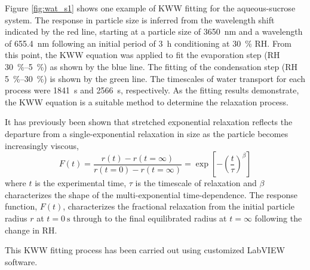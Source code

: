 Figure \ref{fig:wat_s1} shows one example of KWW fitting for the aqueous-sucrose system. The response in particle size is inferred from the wavelength shift indicated by the red line, starting at a particle size of \SI{3650}{\nano\meter} and a wavelength of \SI{655.4}{\nano\meter} following an initial period of \SI{3}{\hour} conditioning at \SI{30}{\percent} RH. From this point, the KWW equation was applied to fit the evaporation step (RH \SIrange{30}{5}{\percent}) as shown by the blue line. The fitting of the condensation step (RH \SIrange{5}{30}{\percent}) is shown by the green line. The timescales of water transport for each process were \SI{1841}{\second} and \SI{2566}{\second}, respectively. As the fitting results demonstrate, the KWW equation is a suitable method to determine the relaxation process. 

It has previously been shown that stretched exponential relaxation reflects the departure from a single-exponential relaxation in size as the particle becomes increasingly viscous\cite{Rickards2015},
\begin{equation}\label{eqn:wat_si_1}
F(t)=\frac{r(t)-r(t=\infty)}{r(t=0)-r(t=\infty)}=\exp \left[-\left(\frac{t}{\tau}\right)^{\beta}\right]
\end{equation}
where $t$ is the experimental time, $\tau$ is the timescale of relaxation and $\beta$ characterizes the shape of the multi-exponential time-dependence. The response function, $F(t)$, characterizes the fractional relaxation from the initial particle radius $r$ at $t=\SI{0}{\second}$ through to the final equilibrated radius at $t=\infty$ following the change in RH.

This KWW fitting process has been carried out using customized LabVIEW software.

